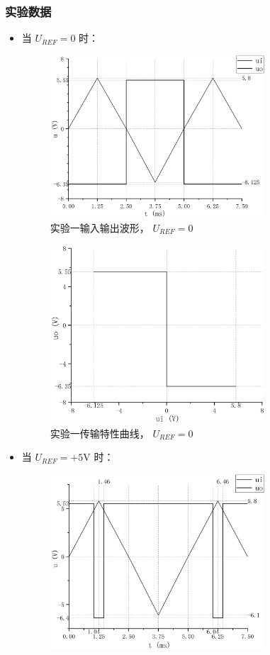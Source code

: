 \documentclass[a4paper,11pt,UTF8]{ctexart}
\newcommand\mr[1]{\mathrm{#1}}
\begin{document}
	\subsubsection{实验数据}
		\begin{itemize}
		 \item 当 $U_{REF}=0$ 时：
		 \begin{figure}[H]
	 \centering
	 \includegraphics[width=8cm]{1-1-1}
	 \caption{实验一输入输出波形， $U_{REF}=0$}
	 \label{fig:1-1-1}
	\end{figure}
	\begin{figure}[H]
	 \centering
	 \includegraphics[width=8cm]{1-1-2}
	 \caption{实验一传输特性曲线， $U_{REF}=0$}
	 \label{fig:1-1-2}
	\end{figure}
	\item 当 $U_{REF}=+5\mr{V}$ 时：
		 \begin{figure}[H]
	 \centering
	 \includegraphics[width=8cm]{1-2-1}

\end{figure}
\end{itemize}
\end{document}
